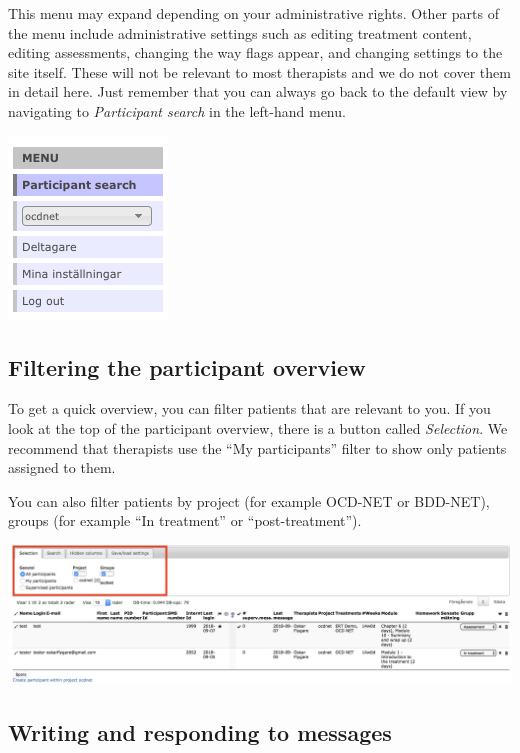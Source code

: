 \documentclass[]{book}
\theoremstyle{definition}
\theoremstyle{definition}
\theoremstyle{definition}
\theoremstyle{remark}
\begin{document}
This menu may expand depending on your administrative rights. Other
parts of the menu include administrative settings such as editing
treatment content, editing assessments, changing the way flags appear,
and changing settings to the site itself. These will not be relevant to
most therapists and we do not cover them in detail here. Just remember
that you can always go back to the default view by navigating to
\emph{Participant search} in the left-hand menu.

\includegraphics{images/therapist-menu.png}

\hypertarget{filtering-the-participant-overview}{%
\subsection{Filtering the participant
overview}\label{filtering-the-participant-overview}}

To get a quick overview, you can filter patients that are relevant to
you. If you look at the top of the participant overview, there is a
button called \emph{Selection}. We recommend that therapists use the
``My participants'' filter to show only patients assigned to them.

You can also filter patients by project (for example OCD-NET or
BDD-NET), groups (for example ``In treatment'' or ``post-treatment'').

\includegraphics{images/filter-participants.png}

\hypertarget{writing-and-responding-to-messages}{%
\subsection{Writing and responding to
messages}\label{writing-and-responding-to-messages}}
\end{document}
